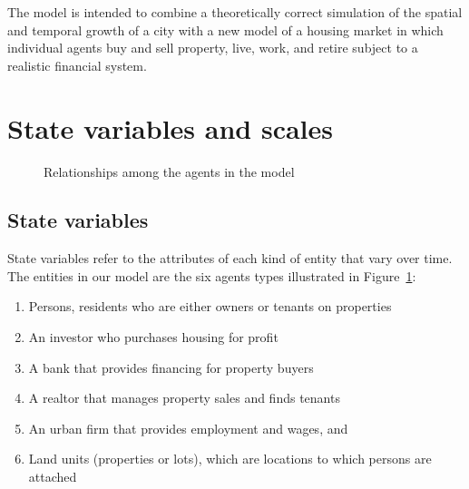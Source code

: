 The model  is intended to combine a theoretically correct simulation of the spatial and temporal growth of a city with a new model of a housing market in which individual agents buy and sell property, live, work, and retire subject to a realistic financial system. 



\section{State variables and scales}

\begin{figure}[h!tb]
    \centering
        \resizebox{\textwidth}{!}{}
     \caption{Relationships among the agents in the model}
\label{fig:Kirsten_overview_figure}
\end{figure}

%         

\subsection{State variables}
State variables refer to the attributes of each kind of entity that vary over time. %
The entities in our model are the six agents types illustrated in Figure~\ref{fig:Kirsten_overview_figure}: 
\begin{enumerate}
    \item Persons, residents who are either owners or tenants on properties
    \item An investor who purchases housing for profit
    \item  A bank that provides financing for property buyers
    \item A realtor that manages property sales and finds tenants 
    \item An urban firm that provides employment and wages, and 
    \item Land units (properties or lots), which are locations to which persons are attached 
\end{enumerate}


